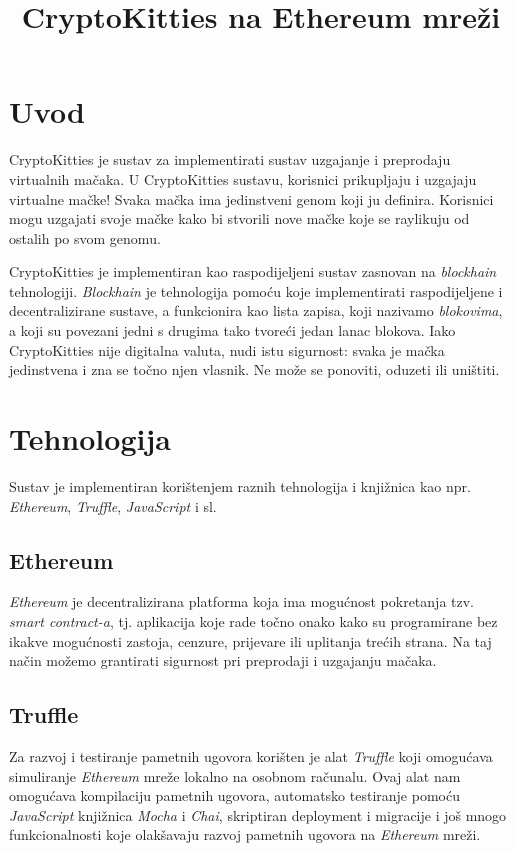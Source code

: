 \documentclass[times, utf8, tehnicka_dokumentacija]{fer}
\def \naslov {CryptoKitties na Ethereum mreži}
\def \ver {1.0}
\def \broj {4}
\def \mentor {Federico Matteo Benčić}
\begin{document}
\title{\naslov}
\verzija{\ver}
\author{\tim}
\size{\broj}
\voditelj{\mentor}

\maketitle
\tableofcontents

\chapter{Uvod}
CryptoKitties je sustav za implementirati sustav uzgajanje i preprodaju virtualnih mačaka. U CryptoKitties sustavu,
korisnici prikupljaju i uzgajaju virtualne mačke! Svaka mačka ima jedinstveni genom koji ju definira. Korisnici mogu
uzgajati svoje mačke kako bi stvorili nove mačke koje se raylikuju od ostalih po svom genomu.

CryptoKitties je implementiran kao raspodijeljeni sustav zasnovan na {\it blockhain} tehnologiji. {\it Blockhain} je
tehnologija pomoću koje implementirati raspodijeljene i decentralizirane sustave, a funkcionira kao lista zapisa, koji
nazivamo {\it blokovima}, a koji su povezani jedni s drugima tako tvoreći jedan lanac blokova. Iako CryptoKitties nije
digitalna valuta, nudi istu sigurnost: svaka je mačka jedinstvena i zna se točno njen vlasnik. Ne može se ponoviti,
oduzeti ili uništiti.

\chapter{Tehnologija}
Sustav je implementiran korištenjem raznih tehnologija i knjižnica kao npr. {\it Ethereum}, {\it Truffle},
{\it JavaScript} i sl.

\section{Ethereum}
{\it Ethereum}  je decentralizirana platforma koja ima mogućnost pokretanja tzv. {\it smart contract-a}, tj. aplikacija
koje rade točno onako kako su programirane bez ikakve mogućnosti zastoja, cenzure, prijevare ili uplitanja trećih
strana. Na taj način možemo grantirati sigurnost pri preprodaji i uzgajanju mačaka.

\section{Truffle}
Za razvoj i testiranje pametnih ugovora korišten je alat {\it Truffle} koji omogućava simuliranje {\it Ethereum} mreže
lokalno na osobnom računalu. Ovaj alat nam omogućava kompilaciju pametnih ugovora, automatsko testiranje pomoću
{\it JavaScript} knjižnica {\it Mocha} i {\it Chai}, skriptiran deployment i migracije i još mnogo funkcionalnosti koje
olakšavaju razvoj pametnih ugovora na {\it Ethereum} mreži.
\end{document}
